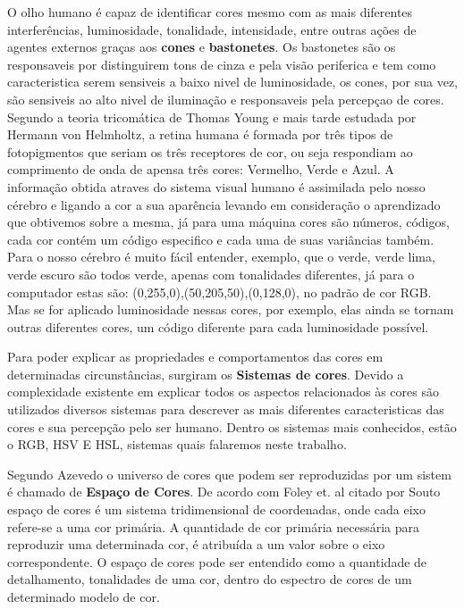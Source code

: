 O olho humano é capaz de identificar cores mesmo com as mais diferentes interferências, luminosidade, tonalidade, intensidade, entre outras ações de agentes externos graças aos \textbf{cones} e \textbf{bastonetes}. Os bastonetes são os responsaveis por distinguirem tons de cinza e pela visão periferica e tem como caracteristica serem sensiveis a baixo nivel de luminosidade\cite{Azevedo:2003}, os cones, por sua vez, são sensiveis ao alto nivel de iluminação e responsaveis pela percepçao de cores\cite{Azevedo:2003}. Segundo a teoria tricomática de Thomas Young e mais tarde estudada por Hermann von Helmholtz\cite{Azevedo:2003}, a retina humana é formada por três tipos de fotopigmentos que seriam os três receptores de cor, ou seja respondiam ao comprimento de onda de apensa três cores: Vermelho, Verde e Azul. A informação obtida atraves do sistema visual humano é assimilada pelo nosso cérebro e ligando a cor a sua aparência levando em consideração o aprendizado que obtivemos sobre a mesma, já para uma máquina cores são números, códigos, cada cor contém um código especifico e cada uma de suas variâncias também. Para o nosso cérebro é muito fácil entender, exemplo, que o verde, verde lima, verde escuro são todos verde, apenas com tonalidades diferentes, já para o computador estas são: (0,255,0),(50,205,50),(0,128,0), no padrão de cor RGB. Mas se for aplicado luminosidade nessas cores, por exemplo, elas ainda se tornam outras diferentes cores, um código diferente para cada luminosidade possível.




Para poder explicar as propriedades e comportamentos das cores em determinadas circunstâncias, surgiram os \textbf{Sistemas de cores}. Devido a complexidade existente em explicar todos os aspectos relacionados às cores são utilizados diversos sistemas para descrever as mais diferentes caracteristicas das cores e sua percepção pelo ser humano\cite{Azevedo:2003}.  Dentro os sistemas mais conhecidos, estão o RGB, HSV E HSL, sistemas quais falaremos neste trabalho.

Segundo Azevedo\cite{Azevedo:2003} o universo de cores que podem ser reproduzidas por um sistem é chamado de \textbf{Espaço de Cores}. De acordo com Foley et. al citado por Souto\cite{Souto:2003} espaço de cores é um sistema tridimensional de coordenadas, onde cada eixo refere-se a uma cor primária. A quantidade de cor primária
necessária para reproduzir uma determinada cor, é atribuída a um valor sobre o eixo
correspondente. O espaço de cores pode ser entendido como a quantidade de detalhamento, tonalidades de uma cor, dentro do espectro de cores de um determinado modelo de cor.

